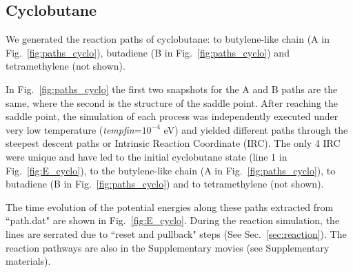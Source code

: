 \documentclass[preprint,12pt]{elsarticle}
\begin{document}
\subsection{Cyclobutane}
We generated the reaction paths of cyclobutane: to butylene-like chain (A in Fig.~\ref{fig:paths_cyclo}), butadiene (B in Fig.~\ref{fig:paths_cyclo}) and tetramethylene (not shown). %

In Fig.~\ref{fig:paths_cyclo} the first two snapshots for the A and B paths are the same, where the second is the structure of the saddle point. After reaching the saddle point, the simulation of each process was independently executed under very low temperature ({\it tempfin}=$10^{-4}$ eV) and yielded different paths through the steepest descent paths or Intrinsic Reaction Coordinate (IRC). The only 4 IRC were unique and have led to the initial cyclobutane state (line 1 in Fig.~\ref{fig:E_cyclo}), to the butylene-like chain (A in Fig.~\ref{fig:paths_cyclo}), to butadiene (B in Fig.~\ref{fig:paths_cyclo}) and to tetramethylene (not shown).


The time evolution of the potential energies along these paths extracted from ``path.dat" are shown in Fig.~\ref{fig:E_cyclo}. During the reaction simulation, the lines are serrated due to ``reset and pullback" steps (See Sec.~\ref{sec:reaction}). The reaction pathways are also in the Supplementary movies (see Supplementary materials). 
\end{document}
